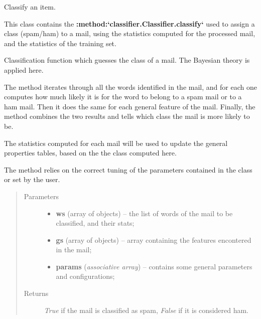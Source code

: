 \documentclass[letterpaper,10pt,english]{sphinxmanual}
\begin{document}
\begin{fulllineitems}
\label{index:classifier.Classifier}
Classify an item.

This class contains the {\color{red}\bfseries{}:method:{}`classifier.Classifier.classify{}`} used to
assign a class (spam/ham) to a mail, using the statistics computed
for the processed mail, and the statistics of the training set.

\begin{fulllineitems}
\label{index:classifier.Classifier.classify}
Classification function which guesses the class of a mail. The Bayesian theory        is applied here.

The method iterates through all the words identified in the mail,
and for each one computes how much likely it is for the word to belong
to a spam mail or to a ham mail. Then it does the same for each general
feature of the mail. Finally, the method combines the two results
and tells which class the mail is more likely to be.

The statistics computed for each mail will be used to update the
general properties tables, based on the the class computed here.

The method relies on the correct tuning of the parameters contained in
the {\hyperref[index:config.Config]{}} class or set by the user.
\begin{quote}\begin{description}
\item[{Parameters}] \leavevmode\begin{itemize}
\item {} 
\textbf{ws} (array of {\hyperref[index:test_stat.Test_word]{}} objects) -- the list of words of the mail to be classified, and their stats;

\item {} 
\textbf{gs} (array of {\hyperref[index:test_stat.Test_stat]{}} objects) -- array containing the features encontered in the mail;

\item {} 
\textbf{params} (\emph{associative array}) -- contains some general parameters and configurations;

\end{itemize}

\item[{Returns}] \leavevmode
\emph{True} if the mail is classified as spam, \emph{False} if it is            considered ham.

\end{description}\end{quote}

\end{fulllineitems}


\end{fulllineitems}
\end{document}
